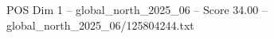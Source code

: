 \begin{textsample}{POS Dim 1 – global\_north\_2025\_06 – Score 34.00 – global\_north\_2025\_06/125804244.txt}
\end{textsample}

